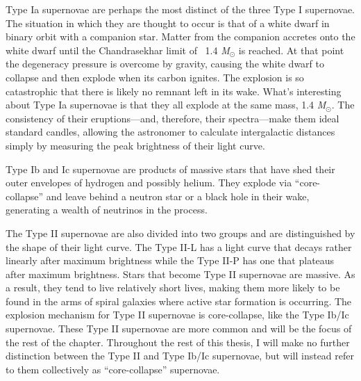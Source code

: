 		Type Ia supernovae are perhaps the most distinct of the three Type I supernovae. The situation in which they are thought to occur is that of a white dwarf in binary orbit with a companion star. Matter from the companion accretes onto the white dwarf until the Chandrasekhar limit of \ 1.4 \emph{M}$_\odot$ is reached. At that point the degeneracy pressure is overcome by gravity, causing the white dwarf to collapse and then explode when its carbon ignites. The explosion is so catastrophic that there is likely no remnant left in its wake. What's interesting about Type Ia supernovae is that they all explode at the same mass, 1.4 \emph{M}$_\odot$. The consistency of their eruptions---and, therefore, their spectra---make them ideal standard candles, allowing the astronomer to calculate intergalactic distances simply by measuring the peak brightness of their light curve.

		Type Ib and Ic supernovae are products of massive stars that have shed their outer envelopes of hydrogen and possibly helium. They explode via ``core-collapse'' and leave behind a neutron star or a black hole in their wake, generating a wealth of neutrinos in the process. 

		The Type II supernovae are also divided into two groups and are distinguished by the shape of their light curve. The Type II-L has a light curve that decays rather linearly after maximum brightness while the Type II-P has one that plateaus after maximum brightness. Stars that become Type II supernovae are massive. As a result, they tend to live relatively short lives, making them more likely to be found in the arms of spiral galaxies where active star formation is occurring. The explosion mechanism for Type II supernovae is core-collapse, like the Type Ib/Ic supernovae. 
		These Type II supernovae are more common\cite{sn_rate} and will be the focus of the rest of the chapter. Throughout the rest of this thesis, I will make no further distinction between the Type II and Type Ib/Ic supernovae, but will instead refer to them collectively as ``core-collapse'' supernovae.


